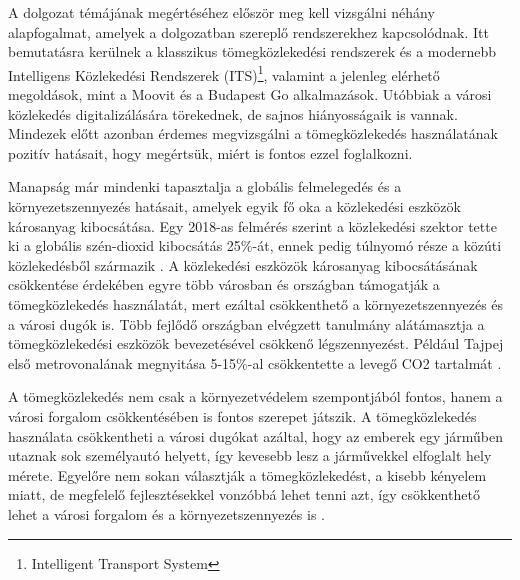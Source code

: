 A dolgozat témájának megértéséhez először meg kell vizsgálni néhány alapfogalmat, amelyek a dolgozatban szereplő rendszerekhez kapcsolódnak. Itt bemutatásra kerülnek a klasszikus tömegközlekedési rendszerek és a modernebb Intelligens Közlekedési Rendszerek (ITS)\footnote{Intelligent Transport System}, valamint a jelenleg elérhető megoldások, mint a Moovit és a Budapest Go alkalmazások. Utóbbiak a városi közlekedés digitalizálására törekednek, de sajnos hiányosságaik is vannak. Mindezek előtt azonban érdemes megvizsgálni a tömegközlekedés használatának pozitív hatásait, hogy megértsük, miért is fontos ezzel foglalkozni.

Manapság már mindenki tapasztalja a globális felmelegedés és a környezetszennyezés hatásait, amelyek egyik fő oka a közlekedési eszközök károsanyag kibocsátása. Egy 2018-as felmérés szerint a közlekedési szektor tette ki a globális szén-dioxid kibocsátás 25\%-át, ennek pedig túlnyomó része a közúti közlekedésből származik \cite{cropper2024measuring}. A közlekedési eszközök károsanyag kibocsátásának csökkentése érdekében egyre több városban és országban támogatják a tömegközlekedés használatát, mert ezáltal csökkenthető a környezetszennyezés és a városi dugók is. Több fejlődő országban elvégzett tanulmány alátámasztja a tömegközlekedési eszközök bevezetésével csökkenő légszennyezést. Például Tajpej első metrovonalának megnyitása 5-15\%-al csökkentette a levegő CO2 tartalmát \cite{cropper2024measuring}.

A tömegközlekedés nem csak a környezetvédelem szempontjából fontos, hanem a városi forgalom csökkentésében is fontos szerepet játszik. A tömegközlekedés használata csökkentheti a városi dugókat azáltal, hogy az emberek egy járműben utaznak sok személyautó helyett, így kevesebb lesz a járművekkel elfoglalt hely mérete. Egyelőre nem sokan választják a tömegközlekedést, a kisebb kényelem miatt, de megfelelő fejlesztésekkel vonzóbbá lehet tenni azt, így csökkenthető lehet a városi forgalom és a környezetszennyezés is \cite{le2016encouraging}.

